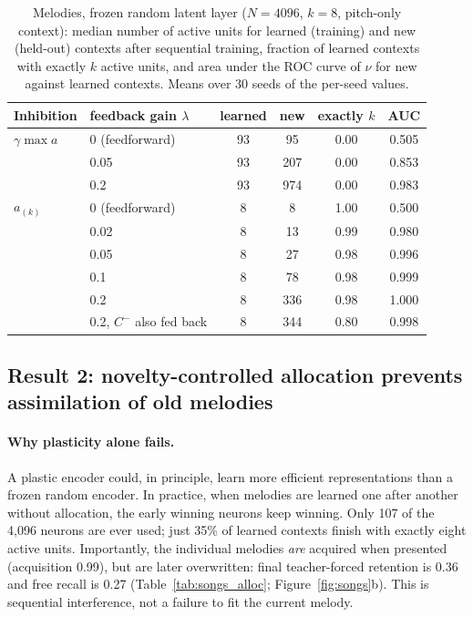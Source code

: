 \documentclass[11pt,a4paper]{article}
\begin{document}
\begin{table}[t]\small\centering
\caption{Melodies, frozen random latent layer ($N=4096$, $k=8$, pitch-only context): median number of active units for learned (training) and new (held-out) contexts after sequential training, fraction of learned contexts with exactly $k$ active units, and area under the ROC curve of $\nu$ for new against learned contexts. Means over 30 seeds of the per-seed values.}\label{tab:songs_det}
\begin{tabular}{@{}llcccc@{}}
\toprule
Inhibition & feedback gain $\lambda$ & learned & new & exactly $k$ & AUC \\
\midrule
$\gamma\max a$ & 0 (feedforward) & 93 & 95 & 0.00 & 0.505 \\
 & 0.05 & 93 & 207 & 0.00 & 0.853 \\
 & 0.2 & 93 & 974 & 0.00 & 0.983 \\
\midrule
$a_{(k)}$ & 0 (feedforward) & 8 & 8 & 1.00 & 0.500 \\
 & 0.02 & 8 & 13 & 0.99 & 0.980 \\
 & 0.05 & 8 & 27 & 0.98 & 0.996 \\
 & 0.1 & 8 & 78 & 0.98 & 0.999 \\
 & 0.2 & 8 & 336 & 0.98 & 1.000 \\
 & 0.2, $C^-$ also fed back & 8 & 344 & 0.80 & 0.998 \\
\bottomrule
\end{tabular}
\end{table}

\subsection{Result 2: novelty-controlled allocation prevents assimilation of old melodies}
\paragraph{Why plasticity alone fails.}
A plastic encoder could, in principle, learn more efficient representations than a frozen random encoder. In practice, when melodies are learned one after another without allocation, the early winning neurons keep winning. Only 107 of the 4{,}096 neurons are ever used; just 35\% of learned contexts finish with exactly eight active units. Importantly, the individual melodies \emph{are} acquired when presented (acquisition 0.99), but are later overwritten: final teacher-forced retention is 0.36 and free recall is 0.27 (Table~\ref{tab:songs_alloc}; Figure~\ref{fig:songs}b). This is sequential interference, not a failure to fit the current melody.
\end{document}

